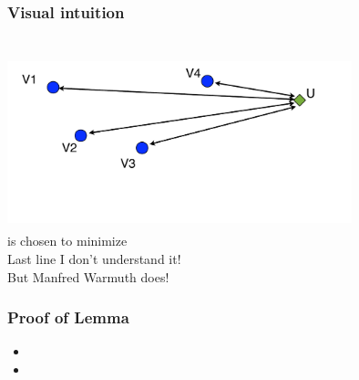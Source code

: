 \documentclass[handout]{beamer}
\begin{document}
\begin{frame}
\frametitle{Visual intuition}

\pause \\
\includegraphics[height=5cm,width=10cm]{figures/divergenceAnalysis.pdf}
\pause \\
 is chosen to minimize 
\pause \\
Last line  I don't understand it!
\pause \\
But Manfred Warmuth does!
\end{frame}

\begin{frame}
\frametitle{Proof of Lemma}
\begin{itemize}
\item {}
\item
{}
\end{itemize}
\end{frame}

\end{document}
